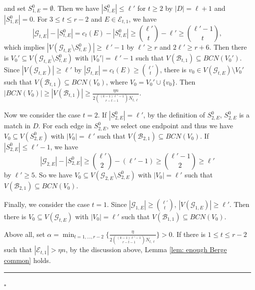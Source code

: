 \documentclass[12pt]{article}%
\def\q{\hfill\rule{1ex}{1ex}}
\def\q{\hfill\rule{1ex}{1ex}}
\newenvironment{proof}{{\noindent\it Proof.}}{\hfill $\square$\par}
\newcommand{\mg}{\mathcal{G}}
\begin{document}
\begin{proof}
     and set $S_{1,E}^{0}=\emptyset$. Then we have $|S_{t,E}^{0}|\leq \ell'$ for $t\geq 2$ by $|D|=\ell+1$ and $|S_{1,E}^{0}|=0$.
          For $3\leq t\leq r-2$ and $E\in \mathcal{E}_{t,1}$, we have
     $$|\mg_{t,E}|-|S_{t,E}^{0}|=c_t(E)-|S_{t,E}^{0}|\geq\binom{\ell'}{t}-\ell'\geq \binom{\ell'-1}{t},$$
     which implies $|V(\mg_{t,E}\setminus S_{t,E}^{0})|\ge \ell'-1$ by  $\ell'\ge r$ and $2\ell'\ge r+6$. Then there is $V_0'\subseteq V(\mg_{t,E}\setminus S_{t,E}^{0})$ with $|V_0'|= \ell'-1$ such that $V(\mathcal{B}_{t,1})\subseteq BCN(V_0')$. Since  $|V(\mg_{t,E})|\ge \ell'$ by $|\mg_{t,E}|=c_t(E)\geq \binom{\ell'}{t}$, there is $v_0\in V(\mg_{t,E})\setminus V_0'$ such that $V(\mathcal{B}_{t,1})\subseteq BCN(V_0)$, where $V_0=V_0'\cup\{v_0\}$. Then  $|BCN(V_0)|\ge |V(\mathcal{B}_{t,1})|\ge \frac{\eta n}{2 \binom{(k-1)\ell'-1}{r-t-1}N_{t,\ell}}$.



     Now we consider the case $t=2$. If $|S_{2,E}^{0}|=\ell'$, by the definition of $S_{2,E}^{0}$, $S_{2,E}^{0}$ is a match  in $D$. For each edge in $S_{2,E}^{0}$, we select one endpoint and thus we have  $V_0\subseteq V(S_{2,E}^{0})$ with $|V_0|= \ell'$ such that $V(\mathcal{B}_{2,1})\subseteq BCN(V_0)$. If $|S_{2,E}^{0}|\leq \ell'-1$, we have
     $$|\mg_{2,E}|-|S_{2,E}^{0}|\geq\binom{\ell'}{2}-(\ell'-1)\geq \binom{\ell'-1}{2}\ge \ell'$$ by $\ell'\ge 5$.
     So we have  $V_0\subseteq V(\mg_{2,E}\setminus S_{2,E}^{0})$ with $|V_0|= \ell'$ such that $V(\mathcal{B}_{2,1})\subseteq BCN(V_0)$.

     Finally, we consider the case $t=1$. Since $|\mg_{1,E}|\geq \binom{\ell'}{t}$,  $|V(\mg_{1,E})|\ge \ell'$. Then there is $V_0\subseteq V(\mg_{t,E})$ with $|V_0|= \ell'$ such that $V(\mathcal{B}_{1,1})\subseteq BCN(V_0)$.
     \par
     Above all, set $\alpha=\min_{t=1,\ldots,r-2}\{\frac{\eta}{2\binom{(k-1)\ell'-1}{r-t-1} N_{t,\ell}}\}>0$. If there is $1\le t\le r-2$ such that
 $|\mathcal{E}_{t,1}|>\eta n$, by the  discussion above, Lemma \ref{lem: enough Berge common} holds.\q


\end{proof}
\end{document}
